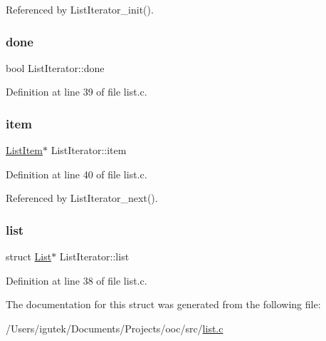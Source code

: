 Referenced by List\+Iterator\+\_\+init().

\mbox{\label{structListIterator_a63d062a738f1a9278cb996d8d6abc262}} 
\subsubsection{\texorpdfstring{done}{done}}
{\footnotesize\ttfamily bool List\+Iterator\+::done}



Definition at line 39 of file list.\+c.

\mbox{\label{structListIterator_a4be321bdc175ecfa3bc9e74e107e8fdd}} 
\subsubsection{\texorpdfstring{item}{item}}
{\footnotesize\ttfamily \mbox{\hyperlink{structListItem}{List\+Item}}$\ast$ List\+Iterator\+::item}



Definition at line 40 of file list.\+c.



Referenced by List\+Iterator\+\_\+next().

\mbox{\label{structListIterator_a6f7c700353a4ce4a687504ba0a0b35e0}} 
\subsubsection{\texorpdfstring{list}{list}}
{\footnotesize\ttfamily struct \mbox{\hyperlink{structList}{List}}$\ast$ List\+Iterator\+::list}



Definition at line 38 of file list.\+c.



The documentation for this struct was generated from the following file\+:\begin{DoxyCompactItemize}
\item 
/\+Users/igutek/\+Documents/\+Projects/ooc/src/\mbox{\hyperlink{list_8c}{list.\+c}}\end{DoxyCompactItemize}
